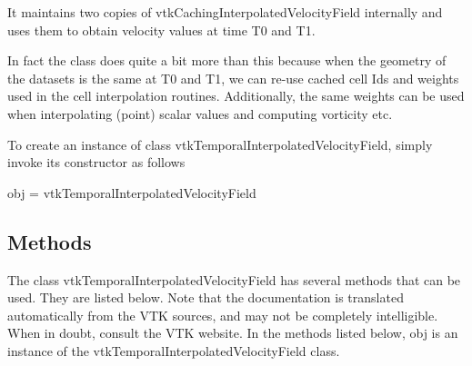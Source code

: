 It maintains two copies of vtk\-Caching\-Interpolated\-Velocity\-Field internally and uses them to obtain velocity values at time T0 and T1.

In fact the class does quite a bit more than this because when the geometry of the datasets is the same at T0 and T1, we can re-\/use cached cell Ids and weights used in the cell interpolation routines. Additionally, the same weights can be used when interpolating (point) scalar values and computing vorticity etc.

To create an instance of class vtk\-Temporal\-Interpolated\-Velocity\-Field, simply invoke its constructor as follows \begin{DoxyVerb}  obj = vtkTemporalInterpolatedVelocityField
\end{DoxyVerb}
 \hypertarget{vtkwidgets_vtkxyplotwidget_Methods}{}\subsection{Methods}\label{vtkwidgets_vtkxyplotwidget_Methods}
The class vtk\-Temporal\-Interpolated\-Velocity\-Field has several methods that can be used. They are listed below. Note that the documentation is translated automatically from the V\-T\-K sources, and may not be completely intelligible. When in doubt, consult the V\-T\-K website. In the methods listed below, {\ttfamily obj} is an instance of the vtk\-Temporal\-Interpolated\-Velocity\-Field class. 
